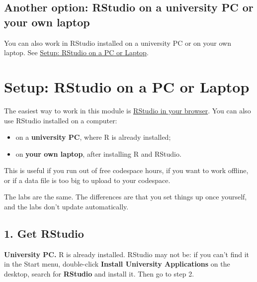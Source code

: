 \documentclass[
  letterpaper,
  DIV=11,
  numbers=noendperiod]{scrreprt}
\providecommand{\tightlist}{%
  \setlength{\itemsep}{0pt}\setlength{\parskip}{0pt}}
\begin{document}
\section*{Another option: RStudio on a university PC or your own
laptop}\label{another-option-rstudio-on-a-university-pc-or-your-own-laptop}


You can also work in RStudio installed on a university PC or on your own
laptop. See \href{localSetup.qmd}{Setup: RStudio on a PC or Laptop}.


\chapter*{Setup: RStudio on a PC or
Laptop}\label{setup-rstudio-on-a-pc-or-laptop}


The easiest way to work in this module is
\hyperref[setup-rstudio-in-your-browser]{RStudio in your browser}. You
can also use RStudio installed on a computer:

\begin{itemize}
\tightlist
\item
  on a \textbf{university PC}, where R is already installed;
\item
  on \textbf{your own laptop}, after installing R and RStudio.
\end{itemize}

This is useful if you run out of free codespace hours, if you want to
work offline, or if a data file is too big to upload to your codespace.

The labs are the same. The differences are that you set things up once
yourself, and the labs don't update automatically.

\section*{1. Get RStudio}\label{get-rstudio}


\textbf{University PC.} R is already installed. RStudio may not be: if
you can't find it in the Start menu, double-click \textbf{Install
University Applications} on the desktop, search for \textbf{RStudio} and
install it. Then go to step 2.
\end{document}
